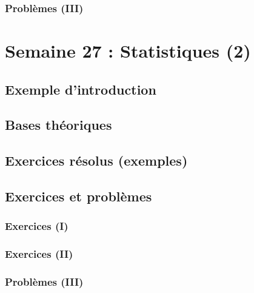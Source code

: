 \documentclass[
  12pt,
]{book}
\begin{document}
\hypertarget{probluxe8mes-iii-25}{%
\subsection{Problèmes (III)}\label{probluxe8mes-iii-25}}

\hypertarget{semaine-27-statistiques-2}{%
\chapter{Semaine 27 : Statistiques (2)}\label{semaine-27-statistiques-2}}

\hypertarget{exemple-dintroduction-26}{%
\section{Exemple d'introduction}\label{exemple-dintroduction-26}}

\hypertarget{bases-thuxe9oriques-26}{%
\section{Bases théoriques}\label{bases-thuxe9oriques-26}}

\hypertarget{exercices-ruxe9solus-exemples-26}{%
\section{Exercices résolus (exemples)}\label{exercices-ruxe9solus-exemples-26}}

\hypertarget{exercices-et-probluxe8mes-26}{%
\section{Exercices et problèmes}\label{exercices-et-probluxe8mes-26}}

\hypertarget{exercices-i-26}{%
\subsection{Exercices (I)}\label{exercices-i-26}}

\hypertarget{exercices-ii-26}{%
\subsection{Exercices (II)}\label{exercices-ii-26}}

\hypertarget{probluxe8mes-iii-26}{%
\subsection{Problèmes (III)}\label{probluxe8mes-iii-26}}
\end{document}
